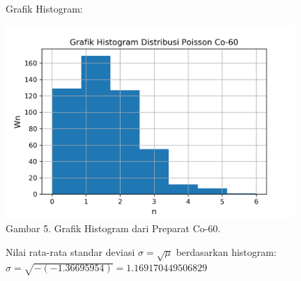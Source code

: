 \documentclass{article}
\begin{document}
			Grafik Histogram:
			\begin{center}
				\includegraphics[width=110mm]{Data/Co-60.png}\\
				Gambar 5. Grafik Histogram dari Preparat Co-60.
			\end{center} 
			Nilai rata-rata standar deviasi $\sigma = \sqrt{\mu}$ berdasarkan histogram:\\
			$\sigma = \sqrt{-(-1.36695954)} = 1.169170449506829$ 		
			
\end{document}
